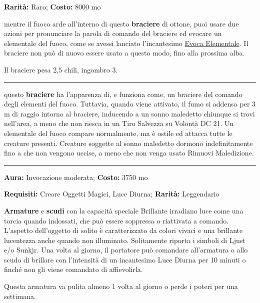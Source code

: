 \begin{multicols}{2}
\textbf{Rarità:} Raro; \textbf{Costo:} 8000 mo

mentre il fuoco arde all'interno di questo \textbf{braciere} di ottone, puoi usare due azioni per pronunciare la parola di comando del braciere ed evocare un elementale del fuoco, come se avessi lanciato l'incantesimo \hyperlink{Evoca Elementale}{Evoca Elementale}. Il braciere non può di nuovo essere usato a questo modo, fino alla prossima alba.

Il braciere pesa 2,5 chili, ingombro 3.

\smallskip\noindent\rule{\linewidth}{2pt}  \hypertarget{BracieredelSonnomaledetto}{}\medskip{}\noindent\label{BracieredelSonnomaledetto}

questo \textbf{braciere} ha l'apparenza di, e funziona come, un braciere del comando degli elementi del fuoco. Tuttavia, quando viene attivato, il fumo si addensa per 3 m di raggio intorno al braciere, inducendo a un sonno maledetto chiunque si trovi nell'area, a meno che non riesca in un Tiro Salvezza su Volontà DC 21. Un elementale del fuoco compare normalmente, ma è ostile ed attacca tutte le creature presenti. Creature soggette al sonno maledetto dormono indefinitamente fino a che non vengono uccise, a meno che non venga usato Rimuovi Maledizione.

\smallskip\noindent\rule{\linewidth}{2pt}  \hypertarget{Brillante}{}\medskip{}\noindent\label{Brillante}

\textbf{Aura:} Invocazione moderata; \textbf{Costo:} 3750 mo

\textbf{Requisiti:} Creare Oggetti Magici, Luce Diurna; \textbf{Rarità:} Leggendario

\textbf{Armature} e \textbf{scudi} con la capacità speciale Brillante irradiano luce come una torcia quando indossati, che può essere soppressa o riattivata a comando. L'aspetto dell'oggetto di solito è caratterizzato da colori vivaci e una brillante lucentezza anche quando non illuminato. Solitamente riporta i simboli di Ljust e/o Sunkjr. Una volta al giorno, il portatore può comandare all'armatura o allo scudo di brillare con l'intensità di un incantesimo Luce Diurna per 10 minuti o finché non gli viene comandato di affievolirla.

Questa armatura va pulita almeno 1 volta al giorno o perde i poteri per una settimana.


\end{multicols}
